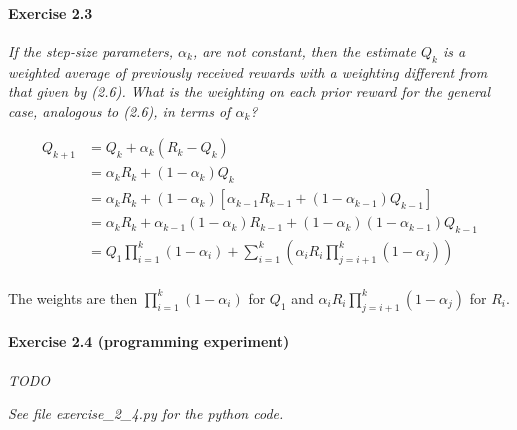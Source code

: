 \paragraph{Exercise 2.3}
\textit{If the step-size parameters, $\alpha_k$, are not constant, then the estimate $Q_k$ is a weighted average of previously received rewards with a weighting different from that given by (2.6). What is the weighting on each prior reward for the general case, analogous to (2.6), in terms of $\alpha_k$?}

\begin{align*}
Q_{k+1} &= Q_k + \alpha_k (R_k - Q_k) \\
        &= \alpha_k R_k + (1 - \alpha_k) Q_k \\
        &= \alpha_k R_k + (1 - \alpha_k) [\alpha_{k-1} R_{k-1} + (1 - \alpha_{k-1}) Q_{k-1}] \\
        &= \alpha_k R_k + \alpha_{k-1} (1 - \alpha_k) R_{k-1} + (1 - \alpha_{k}) (1 - \alpha_{k-1}) Q_{k-1} \\
        &= Q_1 \prod_{i=1}^k (1 - \alpha_i)  + \sum_{i=1}^k \left( \alpha_i R_i \prod_{j=i+1}^{k} (1 - \alpha_j)  \right) \\
\end{align*}

The weights are then $\prod_{i=1}^k (1 - \alpha_i)$ for $Q_1$ and $\alpha_i R_i \prod_{j=i+1}^{k} (1 - \alpha_j)$ for $R_i$.

\paragraph{Exercise 2.4 (programming experiment)}
\textit{TODO}

\textit{See file exercise\_2\_4.py for the python code.}
